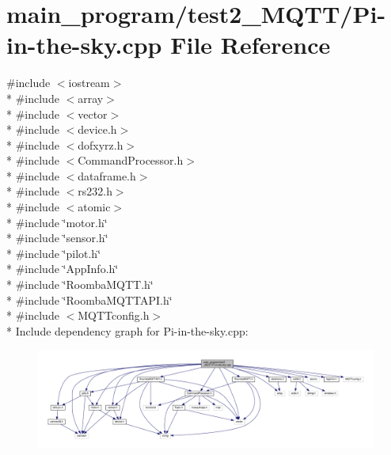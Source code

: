 \hypertarget{test2___m_q_t_t_2_pi-in-the-sky_8cpp}{}\section{main\+\_\+program/test2\+\_\+\+M\+Q\+T\+T/\+Pi-\/in-\/the-\/sky.cpp File Reference}
\label{test2___m_q_t_t_2_pi-in-the-sky_8cpp}
{\ttfamily \#include $<$iostream$>$}\\*
{\ttfamily \#include $<$array$>$}\\*
{\ttfamily \#include $<$vector$>$}\\*
{\ttfamily \#include $<$device.\+h$>$}\\*
{\ttfamily \#include $<$dofxyrz.\+h$>$}\\*
{\ttfamily \#include $<$Command\+Processor.\+h$>$}\\*
{\ttfamily \#include $<$dataframe.\+h$>$}\\*
{\ttfamily \#include $<$rs232.\+h$>$}\\*
{\ttfamily \#include $<$atomic$>$}\\*
{\ttfamily \#include \char`\"{}motor.\+h\char`\"{}}\\*
{\ttfamily \#include \char`\"{}sensor.\+h\char`\"{}}\\*
{\ttfamily \#include \char`\"{}pilot.\+h\char`\"{}}\\*
{\ttfamily \#include \char`\"{}App\+Info.\+h\char`\"{}}\\*
{\ttfamily \#include \char`\"{}Roomba\+M\+Q\+T\+T.\+h\char`\"{}}\\*
{\ttfamily \#include \char`\"{}Roomba\+M\+Q\+T\+T\+A\+P\+I.\+h\char`\"{}}\\*
{\ttfamily \#include $<$M\+Q\+T\+Tconfig.\+h$>$}\\*
Include dependency graph for Pi-\/in-\/the-\/sky.cpp\+:\nopagebreak
\begin{figure}[H]
\begin{center}
\leavevmode
\includegraphics[width=350pt]{test2___m_q_t_t_2_pi-in-the-sky_8cpp__incl}
\end{center}
\end{figure}
